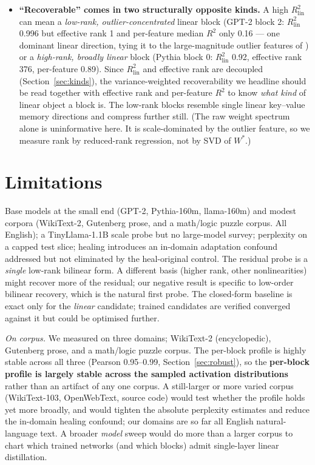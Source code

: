 \documentclass{article}
\newcommand{\Rlin}{R^2_{\mathrm{lin}}}
\begin{document}
\begin{itemize}
  kind of artifact that can masquerade as strong nonlinearity. The exact least-squares ceiling
  removes the confound and should be standard practice.
\item \textbf{``Recoverable'' comes in two structurally opposite kinds.} A high $\Rlin$ can mean a
  \emph{low-rank, outlier-concentrated} linear block (GPT-2 block 2: $\Rlin$ 0.996 but effective
  rank 1 and per-feature median $R^2$ only 0.16 --- one dominant linear direction, tying it to the
  large-magnitude outlier features of \citealp{dettmers2022llmint8}) or a \emph{high-rank, broadly
  linear} block (Pythia block 0: $\Rlin$ 0.92, effective rank 376, per-feature 0.89). Since $\Rlin$
  and effective rank are decoupled (Section~\ref{sec:kinds}), the variance-weighted recoverability we
  headline should be read together with effective rank and per-feature $R^2$ to know \emph{what kind}
  of linear object a block is. The low-rank blocks resemble single linear key--value memory
  directions \citep{geva2021kv} and compress further still. (The raw weight spectrum alone is
  uninformative here. It is scale-dominated by the outlier feature, so we measure rank by
  reduced-rank regression, not by SVD of $W^{*}$.)
\end{itemize}

\section{Limitations}
\label{sec:limitations}

Base models at the small end (GPT-2, Pythia-160m, llama-160m) and modest corpora (WikiText-2,
Gutenberg prose, and a math/logic puzzle corpus. All English); a TinyLlama-1.1B scale probe but
no large-model survey; perplexity on a capped test slice; healing introduces an in-domain adaptation
confound addressed but not eliminated by the heal-original control. The residual probe is a
\emph{single} low-rank bilinear form. A different basis (higher rank, other nonlinearities) might
recover more of the residual; our negative result is specific to low-order bilinear recovery, which
is the natural first probe. The closed-form baseline is exact only for the \emph{linear} candidate;
trained candidates are verified converged against it but could be optimised further.

\emph{On corpus.} We measured on three domains; WikiText-2 (encyclopedic), Gutenberg prose, and a
math/logic puzzle corpus. The per-block profile is highly stable across all three (Pearson
0.95--0.99, Section~\ref{sec:robust}), so the \textbf{per-block profile is largely stable across the
sampled activation distributions} rather than an artifact of any one corpus. A still-larger or more
varied corpus (WikiText-103, OpenWebText, source code) would test whether the profile holds yet more
broadly, and would tighten the absolute perplexity estimates and reduce the in-domain healing
confound; our domains are so far all English natural-language text. A broader \emph{model} sweep would do more than a larger corpus to chart which
trained networks (and which blocks) admit single-layer linear distillation.
\end{document}
